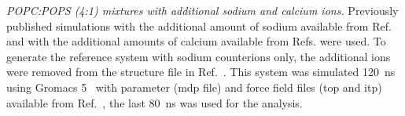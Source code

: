 \documentclass[journal=jpcbfk,manuscript=article]{achemso}
\newcommand{\todo}[1]{\textcolor{red}{#1}}
\begin{document}
\noindent
{\it POPC:POPS (4:1) mixtures with additional sodium and calcium ions.} 
Previously published simulations with the additional amount of sodium \cite{jurkiewicz12}
available from Ref.  and with the additional amounts
of calcium \cite{melcrova16} available from Refs. 
were used. To generate the reference system with sodium counterions only,
the additional ions were removed from the structure file in Ref.~.
This system was simulated 120~ns using Gromacs 5~\cite{abraham2015gromacs} with parameter (mdp file)
and force field files (top and itp) available from Ref.~,
the last 80~ns was used for the analysis.
\end{document}
